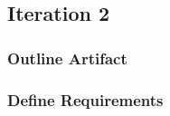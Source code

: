 

%




\subsection{Iteration 2}

\subsubsection*{Outline Artifact}



\subsubsection*{Define Requirements}

